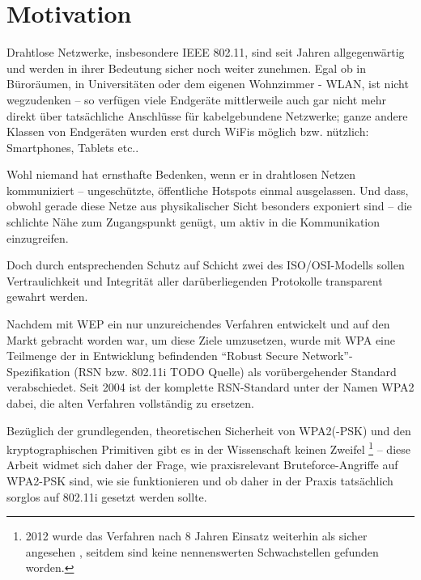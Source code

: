 \section{Motivation}
Drahtlose Netzwerke, insbesondere IEEE 802.11, sind seit Jahren allgegenwärtig und werden in ihrer Bedeutung sicher noch weiter zunehmen. Egal ob in Büroräumen, in Universitäten oder dem eigenen Wohnzimmer - WLAN, ist nicht wegzudenken -- so verfügen viele Endgeräte mittlerweile auch gar nicht mehr direkt über tatsächliche Anschlüsse für kabelgebundene Netzwerke; ganze andere Klassen von Endgeräten wurden erst durch WiFis möglich bzw. nützlich: Smartphones, Tablets etc..

Wohl niemand hat ernsthafte Bedenken, wenn er in drahtlosen Netzen kommuniziert -- ungeschützte, öffentliche Hotspots einmal ausgelassen. Und dass, obwohl gerade diese Netze aus physikalischer Sicht besonders exponiert sind -- die schlichte Nähe zum Zugangspunkt genügt, um aktiv in die Kommunikation einzugreifen.

Doch durch entsprechenden Schutz auf Schicht zwei des ISO/OSI-Modells sollen Vertraulichkeit und Integrität aller darüberliegenden Protokolle transparent gewahrt werden.

Nachdem mit WEP ein nur unzureichendes Verfahren entwickelt und auf den Markt gebracht worden war, um diese Ziele umzusetzen, wurde mit WPA eine Teilmenge der in Entwicklung befindenden \enquote{Robust Secure Network}-Spezifikation (RSN bzw. 802.11i TODO Quelle) als vorübergehender Standard verabschiedet. Seit 2004 ist der komplette RSN-Standard unter der Namen WPA2 dabei, die alten Verfahren vollständig zu ersetzen.	

Bezüglich der grundlegenden, theoretischen Sicherheit von WPA2(-PSK) und den kryptographischen Primitiven gibt es in der Wissenschaft keinen Zweifel \footnote{2012 wurde das Verfahren nach 8 Jahren Einsatz weiterhin als sicher angesehen \cite{kumkar2012}, seitdem sind keine nennenswerten Schwachstellen gefunden worden.} -- diese Arbeit widmet sich daher der Frage, wie praxisrelevant Bruteforce-Angriffe auf WPA2-PSK sind, wie sie funktionieren und ob daher in der Praxis tatsächlich sorglos auf 802.11i gesetzt werden sollte.
